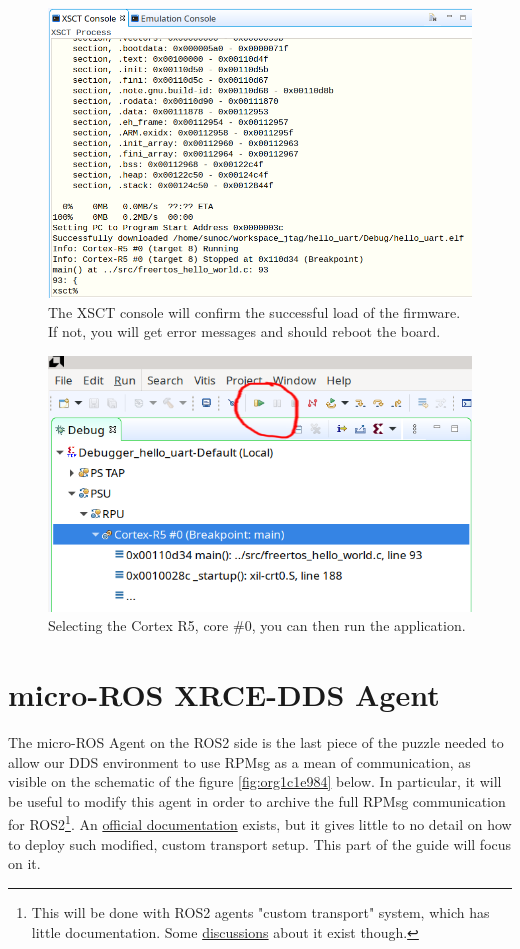 \documentclass[10pt]{article}
\begin{document}
\begin{figure}[htbp]
\centering
\includegraphics[width=.6\textwidth]{./img/jtag/console.png}
\caption{\label{fig:org78bb08f}The XSCT console will confirm the successful load of the firmware. If not, you will get error messages and should reboot the board.}
\end{figure}

\begin{figure}[htbp]
\centering
\includegraphics[width=.6\textwidth]{./img/jtag/run.png}
\caption{\label{fig:orga0490c0}Selecting the Cortex R5, core \#0, you can then run the application.}
\end{figure}

\clearpage
\section{micro-ROS XRCE-DDS Agent}
\label{sec:org6dfec8a}
The micro-ROS Agent on the ROS2 side is the last piece of the puzzle needed to
allow our DDS environment to use RPMsg as a mean of communication, as visible
on the schematic of the figure \ref{fig:org1c1e984} below.
In particular, it will be useful to modify this agent in order to archive
the full RPMsg communication for ROS2\footnote{This will be done with ROS2 agents "custom transport"  system,
which has little documentation. Some \href{https://github.com/micro-ROS/micro\_ros\_setup/issues/383}{discussions} about it exist though.}.
An \href{https://micro.ros.org/docs/tutorials/advanced/create\_custom\_transports/}{official documentation} exists, but it gives little to no detail
on how to deploy such modified, custom transport setup.
This part of the guide will focus on it.
\end{document}

